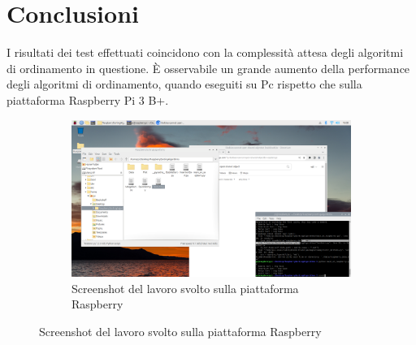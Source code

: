 \documentclass{article}
\begin{document}
		\clearpage
	\section{Conclusioni}
		I risultati dei test effettuati coincidono con la complessità attesa degli algoritmi di ordinamento in questione.
		È osservabile un grande aumento della performance degli algoritmi di ordinamento, quando eseguiti su Pc rispetto che sulla piattaforma Raspberry Pi 3 B+.
		
		\begin{figure}[h]
			\centering
			
			\begin{subfigure}{1\textwidth}
				\centering
				\includegraphics[width = \textwidth]{./Imgs/RaspberryScreenshot.png}
				\caption{Screenshot del lavoro svolto sulla piattaforma Raspberry}
			\end{subfigure}
  
		\end{figure}
	
	
\end{document}
